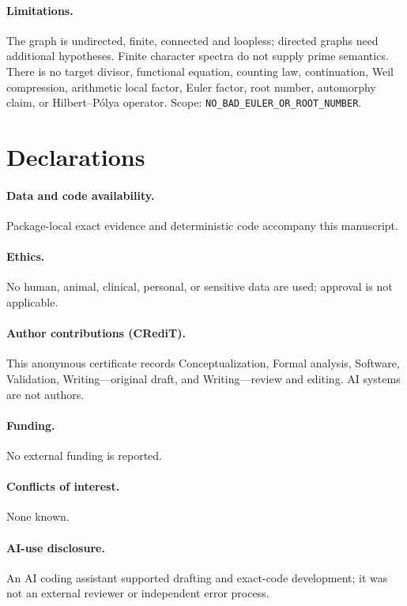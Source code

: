 \documentclass[10pt]{article}
\begin{document}
\paragraph{Limitations.}
The graph is undirected, finite, connected and loopless; directed graphs need
additional hypotheses. Finite character spectra do not supply prime semantics.
There is no target divisor, functional equation, counting law, continuation,
Weil compression, arithmetic local factor, Euler factor, root number,
automorphy claim, or Hilbert--P\'olya operator. Scope:
\texttt{NO\_BAD\_EULER\_OR\_ROOT\_NUMBER}.

\section*{Declarations}
\paragraph{Data and code availability.} Package-local exact evidence and
deterministic code accompany this manuscript.
\paragraph{Ethics.} No human, animal, clinical, personal, or sensitive data
are used; approval is not applicable.
\paragraph{Author contributions (CRediT).} This anonymous certificate records
Conceptualization, Formal analysis, Software, Validation, Writing---original
draft, and Writing---review and editing. AI systems are not authors.
\paragraph{Funding.} No external funding is reported.
\paragraph{Conflicts of interest.} None known.
\paragraph{AI-use disclosure.} An AI coding assistant supported drafting and
exact-code development; it was not an external reviewer or independent error
process.
\end{document}
